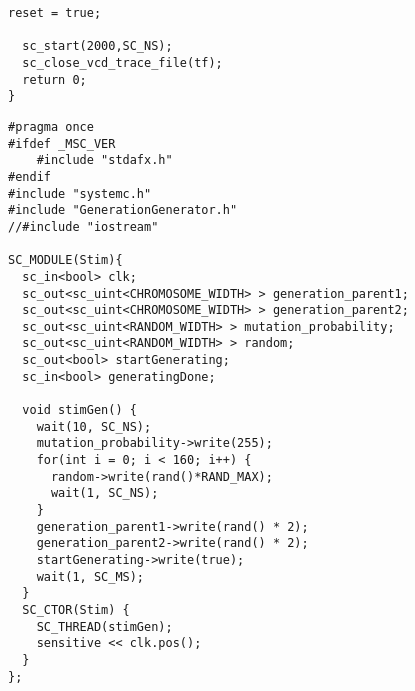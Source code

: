 \begin{lstlisting}[style=customc++,caption={Testbench for GenerationGenerator},label={lst:generatorTestbench}]
  reset = true;

  sc_start(2000,SC_NS);
  sc_close_vcd_trace_file(tf);
  return 0;
}
\end{lstlisting}


\begin{lstlisting}[style=customc++,caption={Stimulation for Generationgenerator},label={lst:generationGeneratiorStim}]
#pragma once
#ifdef _MSC_VER
	#include "stdafx.h"
#endif
#include "systemc.h"
#include "GenerationGenerator.h"
//#include "iostream"

SC_MODULE(Stim){
  sc_in<bool> clk;
  sc_out<sc_uint<CHROMOSOME_WIDTH> > generation_parent1;
  sc_out<sc_uint<CHROMOSOME_WIDTH> > generation_parent2;
  sc_out<sc_uint<RANDOM_WIDTH> > mutation_probability;
  sc_out<sc_uint<RANDOM_WIDTH> > random;
  sc_out<bool> startGenerating;
  sc_in<bool> generatingDone;

  void stimGen() {
    wait(10, SC_NS);
    mutation_probability->write(255);
    for(int i = 0; i < 160; i++) {
      random->write(rand()*RAND_MAX);
      wait(1, SC_NS);
    }
    generation_parent1->write(rand() * 2);
    generation_parent2->write(rand() * 2);
    startGenerating->write(true);
    wait(1, SC_MS);
  }
  SC_CTOR(Stim) {
    SC_THREAD(stimGen);
    sensitive << clk.pos();
  }
};
\end{lstlisting}


